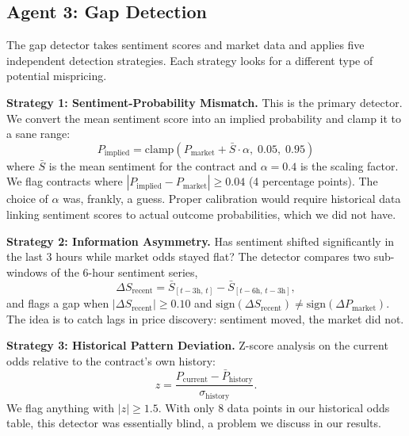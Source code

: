 \documentclass[conference]{IEEEtran}
\begin{document}
\subsection{Agent 3: Gap Detection}

The gap detector takes sentiment scores and market data and applies five independent detection strategies. Each strategy looks for a different type of potential mispricing.

\textbf{Strategy 1: Sentiment-Probability Mismatch.}
This is the primary detector. We convert the mean sentiment score into an implied probability and clamp it to a sane range:
\begin{equation}
P_{\text{implied}} = \text{clamp}\left( P_{\text{market}} + \bar{S} \cdot \alpha, \; 0.05, \; 0.95 \right)
\label{eq:implied}
\end{equation}
where $\bar{S}$ is the mean sentiment for the contract and $\alpha = 0.4$ is the scaling factor. We flag contracts where $|P_{\text{implied}} - P_{\text{market}}| \geq 0.04$ (4 percentage points). The choice of $\alpha$ was, frankly, a guess. Proper calibration would require historical data linking sentiment scores to actual outcome probabilities, which we did not have.

\textbf{Strategy 2: Information Asymmetry.}
Has sentiment shifted significantly in the last 3 hours while market odds stayed flat? The detector compares two sub-windows of the 6-hour sentiment series,
\begin{equation}
\Delta S_{\text{recent}} = \bar{S}_{[t-3\text{h},\,t]} - \bar{S}_{[t-6\text{h},\,t-3\text{h}]},
\end{equation}
and flags a gap when $|\Delta S_{\text{recent}}| \geq 0.10$ and $\text{sign}(\Delta S_{\text{recent}}) \neq \text{sign}(\Delta P_{\text{market}})$. The idea is to catch lags in price discovery: sentiment moved, the market did not.

\textbf{Strategy 3: Historical Pattern Deviation.}
Z-score analysis on the current odds relative to the contract's own history:
\begin{equation}
z = \frac{P_{\text{current}} - \bar{P}_{\text{history}}}{\sigma_{\text{history}}}.
\end{equation}
We flag anything with $|z| \geq 1.5$. With only 8 data points in our historical odds table, this detector was essentially blind, a problem we discuss in our results.
\end{document}
